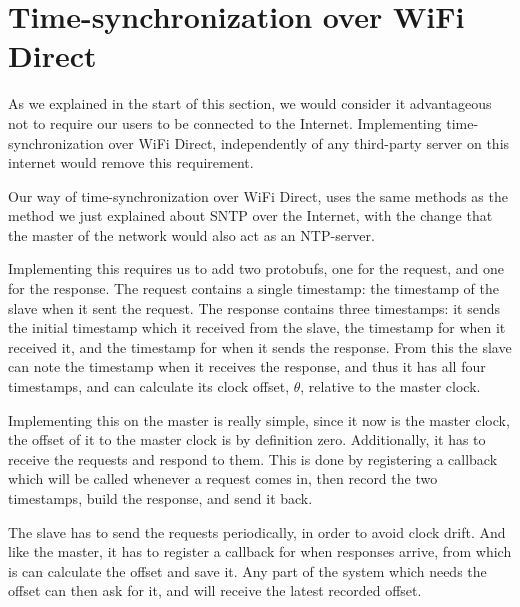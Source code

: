 \section{Time-synchronization over WiFi Direct}
As we explained in the start of this section, we would consider it advantageous not to require our users to be connected to the Internet.
Implementing time-synchronization over WiFi Direct, independently of any third-party server on this internet would remove this requirement.

Our way of time-synchronization over WiFi Direct, uses the same methods as the method we just explained about \ac{SNTP} over the Internet, with the change that the master of the network would also act as an \ac{NTP}-server.

Implementing this requires us to add two protobufs, one for the request, and one for the response.
The request contains a single timestamp: the timestamp of the slave when it sent the request.
The response contains three timestamps: it sends the initial timestamp which it received from the slave, the timestamp for when it received it, and the timestamp for when it sends the response.
From this the slave can note the timestamp when it receives the response, and thus it has all four timestamps, and can calculate its clock offset, $\theta$, relative to the master clock.

Implementing this on the master is really simple, since it now is the master clock, the offset of it to the master clock is by definition zero.
Additionally, it has to receive the requests and respond to them.
This is done by registering a callback which will be called whenever a request comes in, then record the two timestamps, build the response, and send it back.

The slave has to send the requests periodically, in order to avoid clock drift.
And like the master, it has to register a callback for when responses arrive, from which is can calculate the offset and save it.
Any part of the system which needs the offset can then ask for it, and will receive the latest recorded offset.

